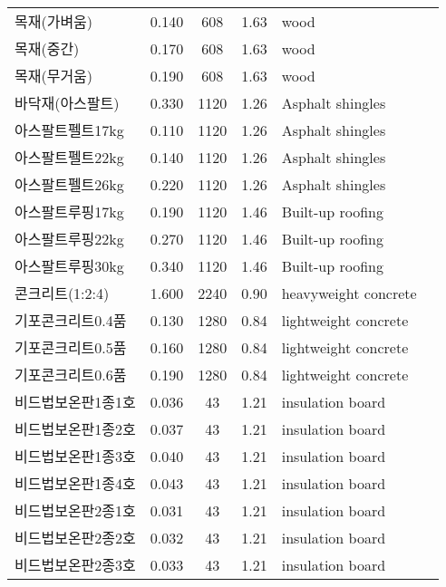 \begin{longtable}{llcclc}
  목재(가벼움) &   0.140 &  608 & 1.63 & wood & \cite{ashrae_f18} \\
  목재(중간) &   0.170 &  608 & 1.63 & wood & \cite{ashrae_f18} \\
  목재(무거움) &   0.190 &  608 & 1.63 & wood & \cite{ashrae_f18} \\
  바닥재(아스팔트) &   0.330 & 1120 & 1.26 & Asphalt shingles & \cite{ashrae_f18} \\
  아스팔트펠트17kg &   0.110 & 1120 & 1.26 & Asphalt shingles & \cite{ashrae_f18} \\
  아스팔트펠트22kg &   0.140 & 1120 & 1.26 & Asphalt shingles & \cite{ashrae_f18} \\
  아스팔트펠트26kg &   0.220 & 1120 & 1.26 & Asphalt shingles & \cite{ashrae_f18} \\
  아스팔트루핑17kg &   0.190 & 1120 & 1.46 & Built-up roofing & \cite{ashrae_f18} \\
  아스팔트루핑22kg &   0.270 & 1120 & 1.46 & Built-up roofing & \cite{ashrae_f18} \\
  아스팔트루핑30kg &   0.340 & 1120 & 1.46 & Built-up roofing & \cite{ashrae_f18} \\
  콘크리트(1:2:4) &   1.600 & 2240 & 0.90 & heavyweight concrete & \cite{ashrae_f18} \\
  기포콘크리트0.4품 &   0.130 & 1280 & 0.84 & lightweight concrete & \cite{ashrae_f18} \\
  기포콘크리트0.5품 &   0.160 & 1280 & 0.84 & lightweight concrete & \cite{ashrae_f18} \\
  기포콘크리트0.6품 &   0.190 & 1280 & 0.84 & lightweight concrete & \cite{ashrae_f18} \\
  비드법보온판1종1호 &   0.036 &   43 & 1.21 & insulation board & \cite{ashrae_f18} \\
  비드법보온판1종2호 &   0.037 &   43 & 1.21 & insulation board & \cite{ashrae_f18} \\
  비드법보온판1종3호 &   0.040 &   43 & 1.21 & insulation board & \cite{ashrae_f18} \\
  비드법보온판1종4호 &   0.043 &   43 & 1.21 & insulation board & \cite{ashrae_f18} \\
  비드법보온판2종1호 &   0.031 &   43 & 1.21 & insulation board & \cite{ashrae_f18} \\
  비드법보온판2종2호 &   0.032 &   43 & 1.21 & insulation board & \cite{ashrae_f18} \\
  비드법보온판2종3호 &   0.033 &   43 & 1.21 & insulation board & \cite{ashrae_f18} \\

\end{longtable}

